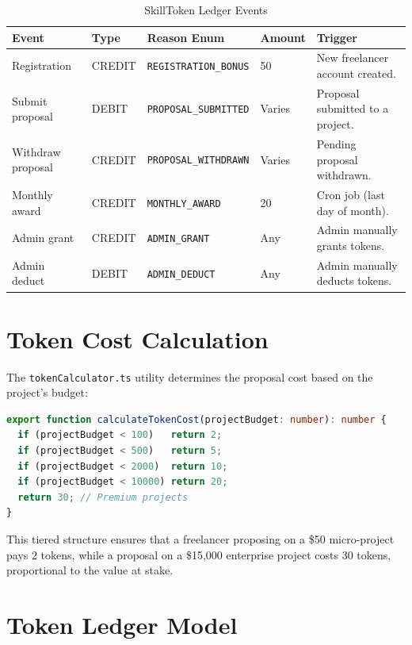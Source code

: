 \begin{table}[H]
\centering
\caption{SkillToken Ledger Events}
\begin{tabularx}{\textwidth}{llllX}
\toprule
\textbf{Event} & \textbf{Type} & \textbf{Reason Enum} & \textbf{Amount} & \textbf{Trigger} \\
\midrule
Registration      & CREDIT & \texttt{REGISTRATION\_BONUS}    & 50   & New freelancer account created. \\
Submit proposal   & DEBIT  & \texttt{PROPOSAL\_SUBMITTED}    & Varies & Proposal submitted to a project. \\
Withdraw proposal & CREDIT & \texttt{PROPOSAL\_WITHDRAWN}    & Varies & Pending proposal withdrawn. \\
Monthly award     & CREDIT & \texttt{MONTHLY\_AWARD}         & 20   & Cron job (last day of month). \\
Admin grant       & CREDIT & \texttt{ADMIN\_GRANT}           & Any  & Admin manually grants tokens. \\
Admin deduct      & DEBIT  & \texttt{ADMIN\_DEDUCT}          & Any  & Admin manually deducts tokens. \\
\bottomrule
\end{tabularx}
\end{table}

\section{Token Cost Calculation}

The \texttt{tokenCalculator.ts} utility determines the proposal cost based on the project's budget:

\begin{lstlisting}[language=TypeScript, caption={Token Cost Calculation Logic}]
export function calculateTokenCost(projectBudget: number): number {
  if (projectBudget < 100)   return 2;
  if (projectBudget < 500)   return 5;
  if (projectBudget < 2000)  return 10;
  if (projectBudget < 10000) return 20;
  return 30; // Premium projects
}
\end{lstlisting}

This tiered structure ensures that a freelancer proposing on a \$50 micro-project pays 2 tokens, while a proposal on a \$15,000 enterprise project costs 30 tokens, proportional to the value at stake.

\section{Token Ledger Model}


